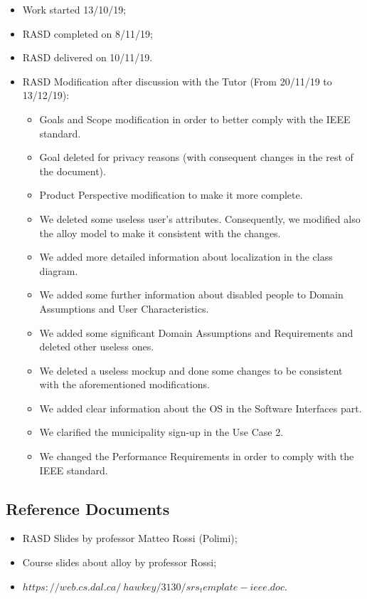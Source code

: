 \documentclass[titlepage]{article}
\begin{document}
\begin{itemize}

	\item Work started 13/10/19;
	\item RASD completed on 8/11/19;
	\item RASD delivered on 10/11/19.
	\item RASD Modification after discussion with the Tutor (From 20/11/19 to 13/12/19):
	\begin{itemize}
	\item Goals and Scope modification in order to better comply with the IEEE standard.
	\item Goal deleted for privacy reasons (with consequent changes in the rest of the document).
	\item Product Perspective modification to make it more complete.
	\item We deleted some useless user's attributes. Consequently, we modified also the alloy model to make it consistent with the changes.
	\item We added more detailed information about localization in the class diagram.
	\item We added some further information about disabled people to Domain Assumptions and User Characteristics.
	\item We added some significant Domain Assumptions and Requirements and deleted other useless ones.
	\item We deleted a useless mockup and done some changes to be consistent with the aforementioned modifications.
	\item We added clear information about the OS in the Software Interfaces part.
	\item We clarified the municipality sign-up in the Use Case 2.
	\item We changed the Performance Requirements in order to comply with the IEEE standard.
	\end{itemize}

\end{itemize}

\subsection{Reference Documents}
\begin{itemize}
	\item RASD Slides by professor Matteo Rossi (Polimi);
	\item Course slides about alloy by professor Rossi;
	\item $https://web.cs.dal.ca/~hawkey/3130/srs_template-ieee.doc.$
	
\end{itemize}
\end{document}

